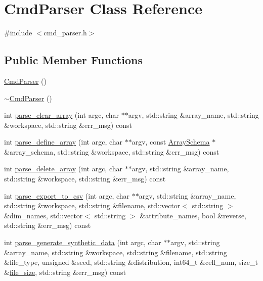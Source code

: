 \hypertarget{classCmdParser}{}\section{Cmd\+Parser Class Reference}
\label{classCmdParser}


{\ttfamily \#include $<$cmd\+\_\+parser.\+h$>$}

\subsection*{Public Member Functions}
\begin{DoxyCompactItemize}
\item 
\hyperlink{classCmdParser_a2ea6dfe5c12c9effc1419764e46e076e}{Cmd\+Parser} ()
\item 
\hyperlink{classCmdParser_a6b7e3267e702350917314ae9730fcb3c}{$\sim$\+Cmd\+Parser} ()
\item 
int \hyperlink{classCmdParser_ac3ec2c0cf6f05e6c0e867b8bdb05eeca}{parse\+\_\+clear\+\_\+array} (int argc, char $\ast$$\ast$argv, std\+::string \&array\+\_\+name, std\+::string \&workspace, std\+::string \&err\+\_\+msg) const 
\item 
int \hyperlink{classCmdParser_abe76873db2d0372ab597297fd90ad5ac}{parse\+\_\+define\+\_\+array} (int argc, char $\ast$$\ast$argv, const \hyperlink{classArraySchema}{Array\+Schema} $\ast$\&array\+\_\+schema, std\+::string \&workspace, std\+::string \&err\+\_\+msg) const 
\item 
int \hyperlink{classCmdParser_af831576a9c80dfb100e3255d86bb74cf}{parse\+\_\+delete\+\_\+array} (int argc, char $\ast$$\ast$argv, std\+::string \&array\+\_\+name, std\+::string \&workspace, std\+::string \&err\+\_\+msg) const 
\item 
int \hyperlink{classCmdParser_a01a18ee8be9150dd592208faa2067049}{parse\+\_\+export\+\_\+to\+\_\+csv} (int argc, char $\ast$$\ast$argv, std\+::string \&array\+\_\+name, std\+::string \&workspace, std\+::string \&filename, std\+::vector$<$ std\+::string $>$ \&dim\+\_\+names, std\+::vector$<$ std\+::string $>$ \&attribute\+\_\+names, bool \&reverse, std\+::string \&err\+\_\+msg) const 
\item 
int \hyperlink{classCmdParser_a14906de8a1b053d72c6730c0e4342076}{parse\+\_\+generate\+\_\+synthetic\+\_\+data} (int argc, char $\ast$$\ast$argv, std\+::string \&array\+\_\+name, std\+::string \&workspace, std\+::string \&filename, std\+::string \&file\+\_\+type, unsigned \&seed, std\+::string \&distribution, int64\+\_\+t \&cell\+\_\+num, size\+\_\+t \&\hyperlink{utils_8h_aa14a014680a5fa9b4c32f4764f58aaee}{file\+\_\+size}, std\+::string \&err\+\_\+msg) const 
$$
\end{DoxyCompactItemize}
